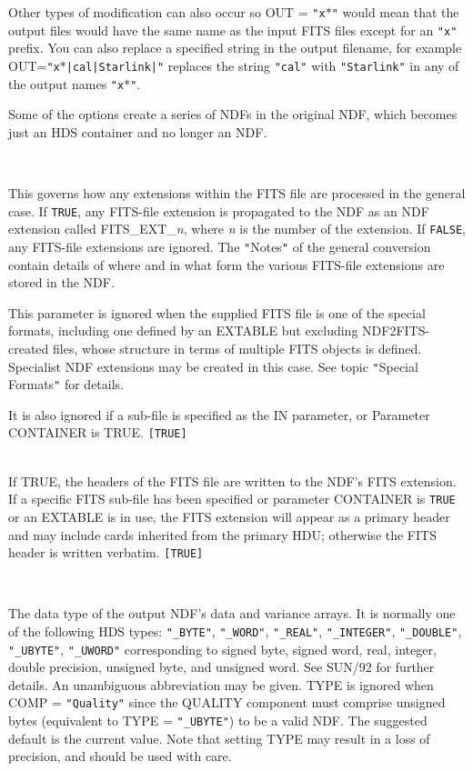 \documentclass[twoside,11pt]{article}
\newcommand{\htmlref}[2]{#1}
\newcommand{\xref}[3]{#1}
\newcommand{\sstsubsection}[1]{ \item[{#1}] \mbox{} \\}
\newcommand{\sstsubsection}[1]{\item[{#1}]}
\begin{document}
{{{         Other types of modification can also occur so OUT = \texttt{"x$*$"}
         would mean that the output files would have the same name as the
         input FITS files except for an \texttt{"x"} prefix.  You can also
         replace a specified string in the output filename, for example
         OUT=\texttt{"x$*$|cal|Starlink|"} replaces the string
         \texttt{"cal"} with \texttt{"Starlink"} in any of the output names
         \texttt{"x$*$"}.

         Some of the options create a series of NDFs in the original NDF,
         which becomes just an HDS container and no longer an NDF.
      }
      \sstsubsection{
         PROEXTS = \_LOGICAL (Read)
      }{
         This governs how any extensions within the FITS file are processed 
         in the general case.  If \texttt{TRUE}, any FITS-file extension is
         propagated to the NDF as an NDF extension
         called FITS\_EXT\_\textit{n}, where \textit{n} is the number of the 
         extension.
         If \texttt{FALSE}, any FITS-file extensions are ignored.  The
         \texttt{"}Notes\texttt{"} of the general conversion contain details of
         where and in what form the various FITS-file extensions are stored
         in the NDF.

         This parameter is ignored when the supplied FITS file is one
         of the special formats, including one defined by an EXTABLE but
         excluding NDF2FITS-created files, whose structure in terms of
         multiple FITS objects is defined. Specialist NDF extensions may be
         created in this case.  See topic 
         \htmlref{\texttt{"}Special Formats\texttt{"}}{special_formats}
         for details.

         It is also ignored if a sub-file is specified as the IN parameter,
         or Parameter CONTAINER is TRUE.  \texttt{[TRUE]}
      }
      \sstsubsection{
         PROFITS = \_LOGICAL (Read)
      }{
         If TRUE, the headers of the FITS file are written to the NDF's
         FITS extension.  If a specific FITS sub-file has been specified or
         parameter CONTAINER is \texttt{TRUE} or an EXTABLE is in use, the FITS
         extension will appear as a primary header and may include cards
         inherited from the primary HDU; otherwise the FITS header is
         written verbatim. \texttt{[TRUE]}
      }
      \sstsubsection{
         TYPE = LITERAL (Read)
      }{
         The data type of the output NDF's data and variance arrays.
	 It is normally one of the following HDS types: \texttt{"\_BYTE"},
	 \texttt{"\_WORD"}, \texttt{"\_REAL"}, \texttt{"\_INTEGER"},
	 \texttt{"\_DOUBLE"}, \texttt{"\_UBYTE"}, \texttt{"\_UWORD"}
	 corresponding to signed byte, signed word, real, integer,
	 double precision, unsigned byte, and unsigned word.  See
	 \xref{SUN/92}{sun92}{} for further details.  An unambiguous
	 abbreviation may be given.  TYPE is ignored when COMP =
	 \texttt{"Quality"} since the QUALITY component must comprise
	 unsigned bytes (equivalent to TYPE = \texttt{"\_UBYTE"}) to
	 be a valid NDF.  The suggested default is the current value.
	 Note that setting TYPE may result in a loss of precision, and
	 should be used with care.

}}}
\end{document}
